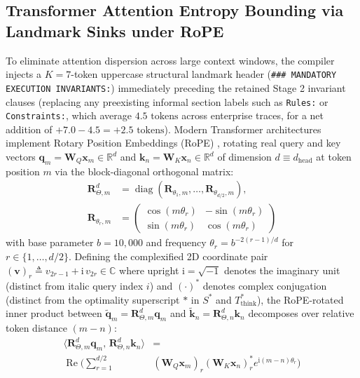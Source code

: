 \documentclass[conference,10pt]{IEEEtran}
\begin{document}
\subsection{Transformer Attention Entropy Bounding via Landmark Sinks under RoPE}
To eliminate attention dispersion across large context windows, the compiler injects a $K=7$-token uppercase structural landmark header (\texttt{\#\#\# MANDATORY EXECUTION INVARIANTS:}) immediately preceding the retained Stage 2 invariant clauses (replacing any preexisting informal section labels such as \texttt{Rules:} or \texttt{Constraints:}, which average $4.5\text{ tokens}$ across enterprise traces, for a net addition of $+7.0 - 4.5 = +2.5\text{ tokens}$). Modern Transformer architectures implement Rotary Position Embeddings (RoPE) \cite{su2024roformer}, rotating real query and key vectors $\mathbf{q}_m = \mathbf{W}_Q \mathbf{x}_m \in \mathbb{R}^d$ and $\mathbf{k}_n = \mathbf{W}_K \mathbf{x}_n \in \mathbb{R}^d$ of dimension $d \equiv d_{\text{head}}$ at token position $m$ via the block-diagonal orthogonal matrix:
\begin{align}
\mathbf{R}_{\Theta, m}^d &= \operatorname{diag}\left(\mathbf{R}_{\theta_1, m}, \dots, \mathbf{R}_{\theta_{d/2}, m}\right), \label{eq:rope_matrix} \\
\mathbf{R}_{\theta_r, m} &= \begin{pmatrix} \cos(m\theta_r) & -\sin(m\theta_r) \\ \sin(m\theta_r) & \cos(m\theta_r) \end{pmatrix} \label{eq:rope_2d}
\end{align}
with base parameter $b = 10{,}000$ and frequency $\theta_r = b^{-2(r-1)/d}$ for $r \in \{1, \dots, d/2\}$. Defining the complexified 2D coordinate pair $(\mathbf{v})_r \triangleq v_{2r-1} + \mathrm{i}\,v_{2r} \in \mathbb{C}$ where upright $\mathrm{i} = \sqrt{-1}$ denotes the imaginary unit (distinct from italic query index $i$) and $(\cdot)^*$ denotes complex conjugation (distinct from the optimality superscript $*$ in $S^*$ and $T_{\text{think}}^*$), the RoPE-rotated inner product between $\tilde{\mathbf{q}}_m = \mathbf{R}_{\Theta, m}^d \mathbf{q}_m$ and $\tilde{\mathbf{k}}_n = \mathbf{R}_{\Theta, n}^d \mathbf{k}_n$ decomposes over relative token distance $(m - n)$:
\begin{equation}
\label{eq:rope_inner_prod}
\begin{aligned}
\langle \mathbf{R}_{\Theta, m}^d \mathbf{q}_m,\, \mathbf{R}_{\Theta, n}^d \mathbf{k}_n \rangle &= \\
\operatorname{Re}\!\Bigg( \sum_{r=1}^{d/2} &(\mathbf{W}_Q \mathbf{x}_m)_r (\mathbf{W}_K \mathbf{x}_n)_r^* e^{\mathrm{i}(m-n)\theta_r} \Bigg)
\end{aligned}
\end{equation}
\end{document}
